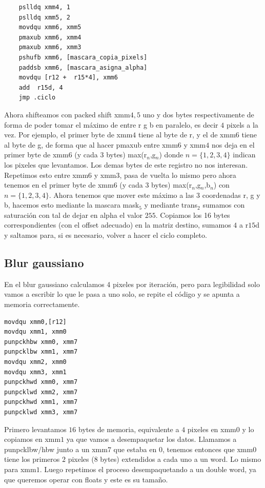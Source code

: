 \documentclass[a4paper]{article}
\begin{document}
\begin{codesnippet}
\begin{verbatim}
    pslldq xmm4, 1                  
    pslldq xmm5, 2               
    movdqu xmm6, xmm5             
    pmaxub xmm6, xmm4             
    pmaxub xmm6, xmm3              
    pshufb xmm6, [mascara_copia_pixels] 
    paddsb xmm6, [mascara_asigna_alpha]
    movdqu [r12 +  r15*4], xmm6
    add  r15d, 4
    jmp .ciclo
\end{verbatim}
\end{codesnippet}
\noindent Ahora shifteamos con packed shift xmm$4,5$ uno y dos bytes respectivamente de forma de poder tomar el máximo de entre r g b en paralelo, es decir $4$ pixels a la vez. Por ejemplo, el primer byte de xmm$4$ tiene al byte de r, y el de xmm$6$ tiene al byte de g, de forma que al hacer pmaxub entre  xmm$6$ y xmm$4$ nos deja en el primer byte de xmm$6$ (y cada 3 bytes) max(r$_n$,g$_n$) donde $n = \{1,2,3,4 \}$ indican los pixeles que levantamos. Los demas bytes de este registro no nos interesan. Repetimos esto entre xmm$6$ y xmm$3$, pasa de vuelta lo mismo pero ahora tenemos en el primer byte de xmm$6$ (y cada $3$ bytes) max(r$_n$,g$_n$,b$_n$) con $n = \{1,2,3,4 \}$. Ahora tenemos que mover este máximo a las 3 coordenadas r, g y b, hacemos esto mediante la mascara mask$_5$ y mediante trans$_2$ sumamos con saturación con tal de dejar en alpha el valor $255$. Copiamos los 16 bytes correspondientes (con el offset adecuado) en la matriz destino, sumamos $4$ a r$15$d y saltamos para, si es necesario, volver a hacer el ciclo completo.

\subsection{Blur gaussiano}

\noindent En el blur gaussiano calculamos 4 pixeles por iteración, pero para legibilidad solo vamos a escribir lo que le pasa a uno solo, se repite el código y se apunta a memoria correctamente. 

\begin{codesnippet}
\begin{verbatim}
movdqu xmm0,[r12]  
movdqu xmm1, xmm0
punpckhbw xmm0, xmm7 
punpcklbw xmm1, xmm7  
movdqu xmm2, xmm0
movdqu xmm3, xmm1
punpckhwd xmm0, xmm7  	
punpcklwd xmm2, xmm7   
punpckhwd xmm1, xmm7  
punpcklwd xmm3, xmm7  
\end{verbatim}
\end{codesnippet}

\noindent Primero levantamos $16$ bytes de memoria, equivalente a $4$ pixeles en xmm$0$ y lo copiamos en xmm$1$ ya que vamos a desempaquetar los datos. Llamamos a punpcklbw/hbw junto a un xmm$7$ que estaba en $0$, tenemos entonces que xmm$0$ tiene los primeros $2$ pixeles ($8$ bytes) extendidos a cada uno a un word. Lo mismo para xmm$1$. Luego repetimos el proceso desempaquetando a un double word, ya que queremos operar con floats y este es su tamaño. 
\end{document}
